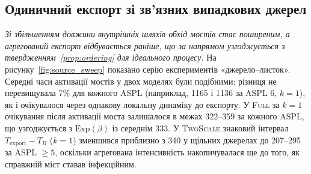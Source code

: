 \documentclass[a4paper,fleqn]{cas-sc}
\newcommand{\Full}{\textup{\textsc{Full}}}
\newcommand{\TS}{\textup{\textsc{TwoScale}}}
\begin{document}
\subsection{Одиничний експорт зі зв'язних випадкових джерел}
\label{sec:res_source}

\emph{Зі збільшенням довжини внутрішніх шляхів обхід мостів стає поширеним, а агрегований експорт відбувається раніше, що за напрямом узгоджується з твердженням~\ref{prop:ordering} для ідеального процесу.} На рисунку~\ref{fig:source_sweep} показано серію експериментів «джерело--листок». Середні часи активації мостів у двох моделях були подібними: різниця не перевищувала 7\% для кожного ASPL (наприклад, 1165 і 1136 за ASPL 6, $k=1$), як і очікувалося через однакову локальну динаміку до експорту. У \Full{} за $k=1$ очікування після активації моста залишалося в межах 322--359 за кожного ASPL, що узгоджується з $\mathrm{Exp}(\beta)$ із середнім 333. У \TS{} знаковий інтервал $T_{\mathrm{export}}-T_B$ ($k=1$) зменшився приблизно з 340 у щільних джерелах до 207--295 за ASPL $\ge5$, оскільки агрегована інтенсивність накопичувалася ще до того, як справжній міст ставав інфекційним.
\end{document}
